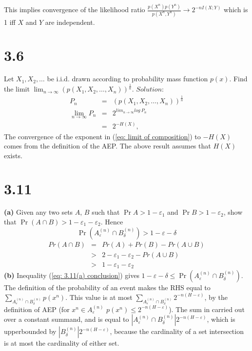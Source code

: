 \documentclass[10pt]{article}
\newcommand{\pref}[1]{{(\ref{#1})}}
\begin{document}
\begin{scriptsize}
\begin{multicols}{3}
This implies convergence of the likelihood ratio
$\frac{p(X^n)p(Y^n)}{p(X^n,Y^n)} \rightarrow 2^{-nI(X;Y)}$ which is 1 iff
$X$ and $Y$ are independent.
\section*{3.6}
Let $X_1,X_2,\dots$ be i.i.d. drawn according to probability mass function
$p(x)$. Find the limit $\lim_{n \to \infty}
(p(X_1,X_2,\dots,X_n))^{\frac{1}{n}}$.
$Solution$:
\begin{eqnarray}
    P_n &=& (p(X_1,X_2,\dots,X_n))^{\frac{1}{n}}
        \label{eq: defn P_n} \\
    \lim_{n\to \infty} P_n &=& 2^{lim_{n\to\infty}log\ P_n}
        \label{eq: limit of composition} \\
    &=& 2^{-H(X)},
        \label{eq: P_n limit} 
    \end{eqnarray} 
    The convergence of the exponent in \pref{eq: limit of composition} to
    $-H(X)$ comes from the definition of the AEP.
    The above result assumes that $H(X)$ exists.
\section*{3.11}
\textbf{(a)}
Given any two sets $A$, $B$ such that $\Pr{A} > 1-\varepsilon_1$ and
$\Pr{B} > 1-\varepsilon_2$, show that $\Pr(A\cap B) > 1 - \varepsilon_1 -
\varepsilon_2$. Hence
\begin{equation}
    \Pr(A_\varepsilon^{(n)} \cap B_\delta^{(n)}) > 1 - \varepsilon - \delta
    \label{eq: 3.11(a) conclusion}
\end{equation}
\proof
\begin{eqnarray}
    Pr(A\cap B) &=& Pr(A) + Pr(B) - Pr(A\cup B)
    \label{eq: pr A intersect B} \\
    &>& 2 - \varepsilon_1 - \varepsilon_2 - Pr(A\cup B)
    \label{eq: sub hypotheses} \\
    &>& 1 - \varepsilon_1 - \varepsilon_2
    \label{eq: 3.11a}
\end{eqnarray}
\textbf{(b)} 
Inequality \pref{eq: 3.11(a) conclusion} gives $1-\varepsilon-\delta \leq \Pr(A_\varepsilon^{(n)} \cap B_\delta^{(n)})$. 
The definition of the probability of an event makes the RHS equal to
$\sum_{A_\varepsilon^{(n)} \cap B_\delta^{(n)}} p(x^n)$.
This value is at most 
$\sum_{A_\varepsilon^{(n)} \cap B_\delta^{(n)}} 2^{-n(H-\varepsilon)}$, 
by the definition of AEP 
(for $x^n \in A_\varepsilon^{(n)}$ $p(x^n) \leq 2^{-n(H - \varepsilon)}$).
The sum in carried out over a constant summand, and is equal to
$|A_\varepsilon^{(n)} \cap B_\delta^{(n)}|2^{-n(H-\varepsilon)}$, which is
upperbounded by $|B_\delta^{(n)}|2^{-n(H-\varepsilon)}$, because the
cardinality of a set intersection is at most the cardinality of either
set.

\end{multicols}
\end{scriptsize}
\end{document}
